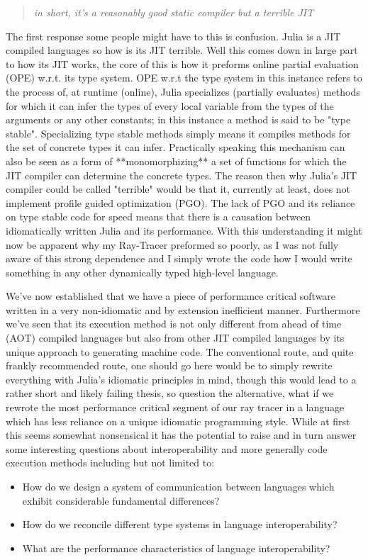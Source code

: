 \begin{quote}
    \textit{in short, it's a reasonably good static compiler but a terrible JIT}
\end{quote}

The first response some people might have to this is confusion. Julia is a JIT compiled languages so how is its JIT terrible. Well this comes down in large part to how its JIT works, the core of this is how it preforms online partial evaluation (OPE) w.r.t. its type system. OPE w.r.t the type system in this instance refers to the process of, at runtime (online), Julia specializes (partially evaluates) methods for which it can infer the types of every local variable from the types of the arguments or any other constants; in this instance a method is said to be "type stable". Specializing type stable methods simply means it compiles methods for the set of concrete types it can infer. Practically speaking this mechanism can also be seen as a form of **monomorphizing** a set of functions for which the JIT compiler can determine the concrete types. The reason then why Julia's JIT compiler could be called "terrible" would be that it, currently at least, does not implement profile guided optimization (PGO). The lack of PGO and its reliance on type stable code for speed means that there is a causation between idiomatically written Julia and its performance. With this understanding it might now be apparent why my Ray-Tracer preformed so poorly, as I was not fully aware of this strong dependence and I simply wrote the code how I would write something in any other dynamically typed high-level language.

We've now established that we have a piece of performance critical software written in a very non-idiomatic and by extension inefficient manner. Furthermore we've seen that its execution method is not only different from ahead of time (AOT) compiled languages but also from other JIT compiled languages by its unique approach to generating machine code. The conventional route, and quite frankly recommended route, one should go here would be to simply rewrite everything with Julia's idiomatic principles in mind, though this would lead to a rather short and likely failing thesis, so question the alternative, what if we rewrote the most performance critical segment of our ray tracer in a language which has less reliance on a unique idiomatic programming style. While at first this seems somewhat nonsensical it has the potential to raise and in turn answer some interesting questions about interoperability and more generally code execution methods including but not limited to:
\begin{itemize}
    \item How do we design a system of communication between languages which exhibit considerable fundamental differences?
    \item How do we reconcile different type systems in language interoperability?
    \item What are the performance characteristics of language interoperability?
\end{itemize}

